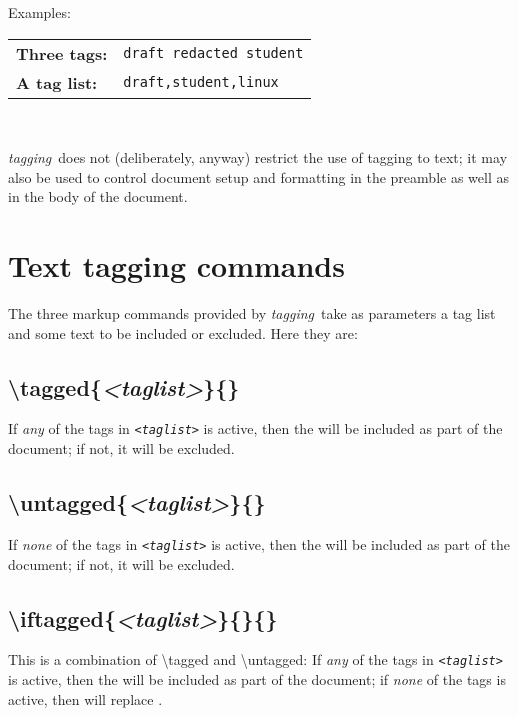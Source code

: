 \documentclass[a4paper,12pt,twoside,openany]{memoir}
\newcommand{\tpn}{tagging}
\newcommand{\tpname}{\textsf{\itshape \tpn}}
\begin{document}
Examples:

\begin{centering}
\begin{tabularx}{0.618\textwidth}{lX}
\textbf{Three tags:}&\texttt{draft redacted student}\\
\textbf{A tag list:}&\texttt{draft,student,linux}
\end{tabularx}\\[\baselineskip]
\end{centering}

\tpname\ does not (deliberately, anyway) restrict the use of tagging to text;
it may also be used to control document setup and formatting in the preamble
as well as in the body of the document.
\section{Text tagging commands}
The three markup commands provided by \tpname\
take as parameters a tag list and some text to be included or excluded.
Here they are:
\subsection{{\ttfamily\textbackslash tagged\{{\itshape<taglist>}\}\{{\itshape<source text>}\}}}
If \emph{any} of the tags in \texttt{\itshape<taglist>} is active,
then the \texttt{\itshape<source text>} will be included as part of the document;
if not, it will be excluded.
\subsection{{\ttfamily\textbackslash untagged\{{\itshape<taglist>}\}\{{\itshape<alt text>}\}}}
If \emph{none} of the tags in \texttt{\itshape<taglist>} is active,
then the \texttt{\itshape<alt text>} will be included as part of the document;
if not, it will be excluded.
\subsection{{\ttfamily\textbackslash iftagged\{{\itshape<taglist>}\}\{{\itshape<source text>}\}\{{\itshape<alt text>}\}}}
This is a combination of {\ttfamily\textbackslash tagged} and {\ttfamily\textbackslash untagged}:
If \emph{any} of the tags in \texttt{\itshape<taglist>} is active,
then the \texttt{\itshape<source text>} will be included as part of the document;
if \emph{none} of the tags is active,
then \texttt{\itshape<alt text>} will replace \texttt{\itshape<source text>}.
\end{document}
